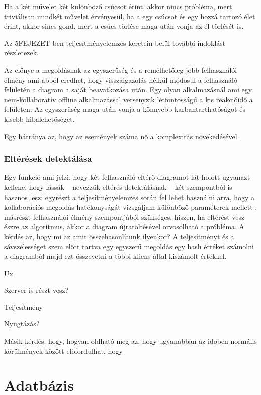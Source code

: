 
Ha a két művelet két különböző csúcsot érint, akkor nincs próbléma, mert triviálisan mindkét művelet érvényesül, ha a egy csúcsot és egy hozzá tartozó élet érint, akkor sincs gond, mert a csúcs törlése maga után vonja az él törlését is. 

Az 5FEJEZET-ben teljesítményelemzés keretein belül további indoklást részletezek. 

Az előnye a megoldásnak az egyszerűség és a remélhetőleg jobb felhasználói élmény ami abból eredhet, hogy visszaigazolás nélkül módosul a felhasználó felületén a diagram a saját beavatkozása után. Egy olyan alkalmazásnál ami egy nem-kollaboratív offline alkalmazással versenyzik létfontosságú a kis reakcióidő a felületen. Az egyszerűség maga után vonja a könnyebb karbantarthatóságot és kisebb hibalehetőséget.   


Egy hátránya az, hogy az események száma nő a komplexitás növekedésével. 



\subsubsection{Eltérések detektálása}

Egy funkció ami jelzi, hogy két felhasználó eltérő diagramot lát holott ugyanazt kellene, hogy lássák -- nevezzük eltérés detektálásnak -- két szempontból is hasznos lesz: egyrészt a teljesítményelemzés során fel lehet használni arra, hogy a kollaborációs megoldás hatékonyságát vizsgáljam különböző paraméterek mellett , másrészt felhasználói élmény szempontjából szükséges, hiszen, ha eltérést vesz észre az algoritmus, akkor a diagram újratöltésével orvosolható a próbléma. 
A kérdés az, hogy mi az amit összehasonlítunk ilyenkor? A teljesítményt és a sávszélességet szem előtt tartva egy egyszerű megoldás egy hash értéket számolni a diagramból majd ezt összevetni a többi kliens által kiszámolt értékkel.

Ux

Szerver is részt vesz?

Teljesítmény

Nyugtázás?

Másik kérdés, hogy, hogyan oldható meg az, hogy ugyanabban az időben normális körülmények között előfordulhat, hogy 



\section{Adatbázis}

